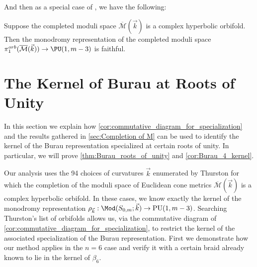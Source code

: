 \documentclass{amsart}
\begin{document}
    And then as a special case of \cite[Theorem 2.26]{Cooper2000Three-dimensionalCone-Manifolds}, we have the following:
    \begin{lemma}\label{lemma:orbifolds_faithful}
        Suppose the completed moduli space $\overline{\mathcal{M}}(\vec k)$ is a complex hyperbolic orbifold. Then the monodromy representation of the completed moduli space $\pi_1^{orb}(\overline{\mathcal{M}}(\vec k)) \to \PU(1,m-3)$ is faithful.
    \end{lemma}
    
\section{The Kernel of Burau at Roots of Unity}\label{sec:narrow kernel}
    In this section we explain how \cref{cor:commutative_diagram_for_specialization} and the results gathered in \cref{sec:Completion of M} can be used to identify the kernel of the Burau representation specialized at certain roots of unity. In particular, we will prove \cref{thm:Burau_roots_of_unity} and \cref{cor:Burau_4_kernel}.
    
    Our analysis uses the 94 choices of curvatures $\vec k$ enumerated by Thurston \cite{Thurston1998ShapesSphere} for which the completion of the moduli space of Euclidean cone metrics $\overline{\mathcal{M}}(\vec k)$ is a complex hyperbolic orbifold. In these cases, we know exactly the kernel of the monodromy representation $\rho_{\vec k}:\Mod(S_{0,m};\vec k) \to \operatorname{PU}(1,m-3)$. Searching Thurston's list of orbifolds allows us, via the commutative diagram of \cref{cor:commutative_diagram_for_specialization}, to restrict the kernel of the associated specialization of the Burau representation. First we demonstrate how our method applies in the $n=6$ case and verify it with a certain braid already known to lie in the kernel of $\beta_6$.
\end{document}
